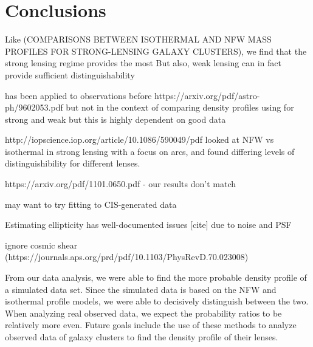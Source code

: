 \documentclass[10pt]{article}
\begin{document}
\section{Conclusions}

Like (COMPARISONS BETWEEN ISOTHERMAL AND NFW MASS PROFILES
FOR STRONG-LENSING GALAXY CLUSTERS), we find that the strong lensing regime provides the most
But also, weak lensing can in fact provide sufficient distinguishability

has been applied to observations before
https://arxiv.org/pdf/astro-ph/9602053.pdf
but not in the context of comparing density profiles using for strong and weak
but this is highly dependent on good data

http://iopscience.iop.org/article/10.1086/590049/pdf looked at NFW vs isothermal in strong lensing with a focus on arcs, and found differing levels of distinguishibility for different lenses.

https://arxiv.org/pdf/1101.0650.pdf - our results don't match

may want to try fitting to CIS-generated data

Estimating ellipticity has well-documented issues [cite] due to noise and PSF


ignore cosmic shear (https://journals.aps.org/prd/pdf/10.1103/PhysRevD.70.023008)

From our data analysis, we were able to find the more probable density profile of a simulated data set.
Since the simulated data is based on the NFW and isothermal profile models, we were able to decisively distinguish between the two.
When analyzing real observed data, we expect the probability ratios to be relatively more even.
Future goals include the use of these methods to analyze observed data of galaxy clusters to find the density profile of their lenses.





\end{document}
